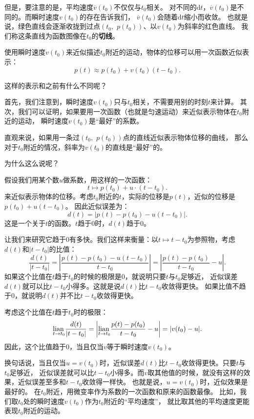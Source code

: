 \documentclass[12pt,UTF8]{ctexbook}
\begin{document}
但是，要注意的是，平均速度$\overline{v}(t_0)$不仅仅与$t_0$相关。
对不同的$\mathrm{d}t$，$\overline{v}(t_0)$是不同的。而瞬时速度$v(t_0)$的存在告诉我们，
$\overline{v}(t_0)$会随着$\mathrm{d}t$缩小而收敛。
也就是说，绿色直线会逐渐收拢到过点$(t_0, \,\,p(t_0))$、以$v(t_0)$为斜率的红色直线。
我们称这条直线为函数图像在$t_0$的\textbf{切线}。

使用瞬时速度$v(t_0)$来近似描述$t_0$附近的运动，物体的位移可以用一次函数近似表示：
$$ p(t) \approx p(t_0) + v(t_0)(t - t_0).$$

这样的表示和之前有什么不同呢？

首先，我们注意到，瞬时速度$v(t_0)$只与$t_0$相关，不需要用别的时刻$t$来计算。
其次，我们可以证明，如果要用一次函数（也就是匀速运动）来近似表示物体在$t_0$附近的运动，
瞬时速度$v(t_0)$是“最好”的系数。

直观来说，如果用一条过$(t_0, \,\,p(t_0))$点的直线近似表示物体位移的曲线，
那么对于$t_0$附近的情况，斜率为$v(t_0)$的直线是“最好”的。

为什么这么说呢？

假设我们用某个数$u$做系数，用这样的一次函数：
$$ t \mapsto p(t_0) + u\cdot (t - t_0).$$
来近似表示物体的位移。考虑$t_0$附近的$t$，实际的位移是$p(t)$，近似的位移是$p(t_0) + u(t - t_0)$。
因此近似误差为：
$$ d(t) = \left|p(t) - p(t_0) - u(t - t_0)\right|. $$
这是一个关于$t$的函数。$t$趋于$0$时，$d(t)$趋于$0$。

让我们来研究它趋于$0$有多快。我们这样来衡量：以$t\mapsto t - t_0$为参照物，考虑$d(t)$和$|t - t_0|$的比值：
$$ \frac{d(t)}{|t - t_0|} = \left|\frac{p(t) - p(t_0) - u(t - t_0)}{t -  t_0}\right| =  \left|\frac{p(t) - p(t_0)}{t -  t_0} - u\right|. $$
如果这个比值在$t$趋于$t_0$的时候的极限是$0$，就说明只要$t$与$t_0$足够近，
近似误差$d(t)$就可以比$t-t_0$小得多。这就是说$d(t)$比$t-t_0$收敛得更快。
如果比值不趋于$0$，就说明$d(t)$并不比$t-t_0$收敛得更快。

考虑这个比值在$t$趋于$t_0$时的极限：
$$ \underset{t\to t_0}{\operatorname{lian}\,} \frac{d(t)}{|t - t_0|} = \left|\underset{t\to t_0}{\operatorname{lian}\,} \frac{p(t) - p(t_0)}{t -  t_0} - u\right| = |v(t_0) - u|. $$
因此，这个比值趋于$0$，当且仅当$v$等于瞬时速度$v(t_0)$。

换句话说，当且仅当$u = v(t_0)$时，近似误差$d(t)$比$t-t_0$收敛得更快。只要$t$与$t_0$足够近，
近似误差就可以比$t-t_0$小得多。而$v$取其他值的时候，就没有这样的效果，近似误差至多和$t-t_0$收敛得一样快。
也就是说，$u = v(t_0)$时，近似效果是最好的。
在$t_0$附近，用微变率作为系数的一次函数和原来的函数最像。
比如，我们取$t_0$处的瞬时速度$v(t_0)$作为$t_0$附近的“平均速度”，
就比取其他的平均速度更能表现$t_0$附近的运动。
\end{document}
